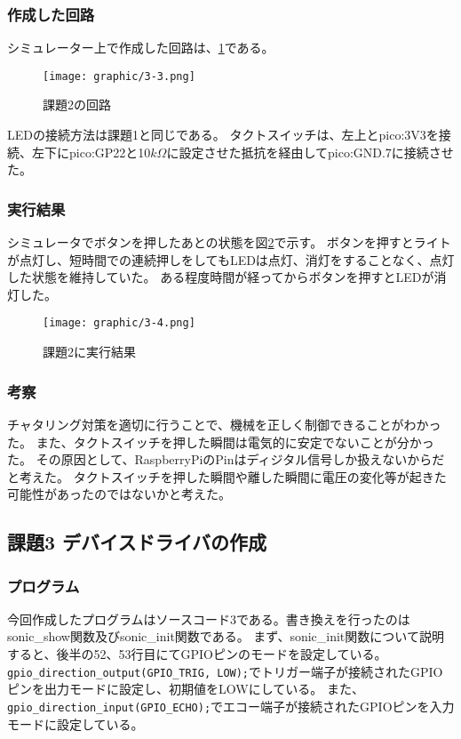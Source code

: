 \documentclass[dvipdfmx]{jsarticle}
\begin{document}
\subsubsection{作成した回路}
シミュレーター上で作成した回路は、\ref*{fig:3-3}である。
\begin{figure}[H]
  \begin{center}
    \texttt{[image: graphic/3-3.png]}
  \end{center}
  \caption{課題2の回路}
  \label{fig:3-3}
\end{figure}
LEDの接続方法は課題1と同じである。
タクトスイッチは、左上とpico:3V3を接続、左下にpico:GP22と10$k\Omega$に設定させた抵抗を経由してpico:GND.7に接続させた。

\subsubsection{実行結果}
シミュレータでボタンを押したあとの状態を図\ref*{fig:3-4}で示す。
ボタンを押すとライトが点灯し、短時間での連続押しをしてもLEDは点灯、消灯をすることなく、点灯した状態を維持していた。
ある程度時間が経ってからボタンを押すとLEDが消灯した。
\begin{figure}[H]
  \begin{center}
    \texttt{[image: graphic/3-4.png]}
  \end{center}
  \caption{課題2に実行結果}
  \label{fig:3-4}
\end{figure}

\subsubsection{考察}
チャタリング対策を適切に行うことで、機械を正しく制御できることがわかった。
また、タクトスイッチを押した瞬間は電気的に安定でないことが分かった。
その原因として、RaspberryPiのPinはディジタル信号しか扱えないからだと考えた。
タクトスイッチを押した瞬間や離した瞬間に電圧の変化等が起きた可能性があったのではないかと考えた。

\subsection{課題3 デバイスドライバの作成}
\subsubsection{プログラム}
今回作成したプログラムはソースコード3である。書き換えを行ったのはsonic\_show関数及びsonic\_init関数である。
まず、sonic\_init関数について説明すると、後半の52、53行目にてGPIOピンのモードを設定している。
\texttt{gpio\_direction\_output(GPIO\_TRIG, LOW);}でトリガー端子が接続されたGPIOピンを出力モードに設定し、初期値をLOWにしている。
また、\texttt{gpio\_direction\_input(GPIO\_ECHO);}でエコー端子が接続されたGPIOピンを入力モードに設定している。
\end{document}

